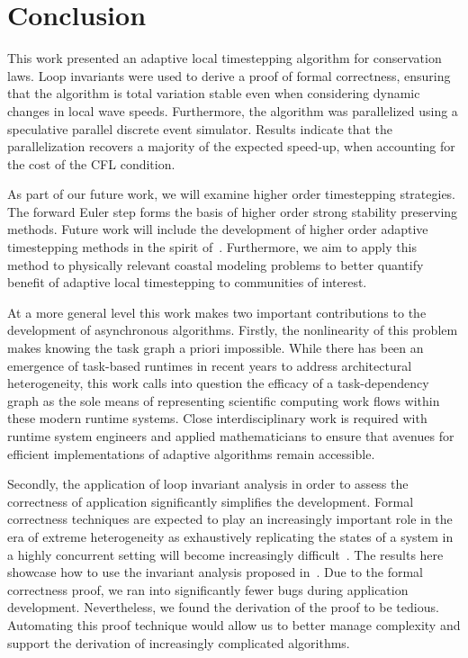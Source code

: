 \section{Conclusion}

This work presented an adaptive local timestepping algorithm for conservation laws. Loop invariants were used to derive a proof of formal correctness, ensuring that the algorithm is total variation stable even when considering dynamic changes in local wave speeds. Furthermore, the algorithm was parallelized using a speculative parallel discrete event simulator. Results indicate that the parallelization recovers a majority of the expected speed-up, when accounting for the cost of the CFL condition.

As part of our future work, we will examine higher order timestepping strategies. The forward Euler step forms the basis of higher order strong stability preserving methods. Future work will include the development of higher order adaptive timestepping methods in the spirit of~\cite{Constantinescu2007}. Furthermore, we aim to apply this method to physically relevant coastal modeling problems to better quantify benefit of adaptive local timestepping to communities of interest.

At a more general level this work makes two important contributions to the development of asynchronous algorithms. Firstly, the nonlinearity of this problem makes knowing the task graph a priori impossible. While there has been an emergence of task-based runtimes in recent years to address architectural heterogeneity, this work calls into question the efficacy of a task-dependency graph as the sole means of representing scientific computing work flows within these modern runtime systems. Close interdisciplinary work is required with runtime system engineers and applied mathematicians to ensure that avenues for efficient implementations of adaptive algorithms remain accessible.

Secondly, the application of loop invariant analysis in order to assess the correctness of application significantly simplifies the development. Formal correctness techniques are expected to play an increasingly important role in the era of extreme heterogeneity as exhaustively replicating the states of a system in a highly concurrent setting will become increasingly difficult~\cite{ExtremeHeterogeneity2018}. The results here showcase how to use the invariant analysis proposed in~\cite{Bientinesi2011}. Due to the formal correctness proof, we ran into significantly fewer bugs during application development. Nevertheless, we found the derivation of the proof to be tedious. Automating this proof technique would allow us to better manage complexity and support the derivation of increasingly complicated algorithms.


